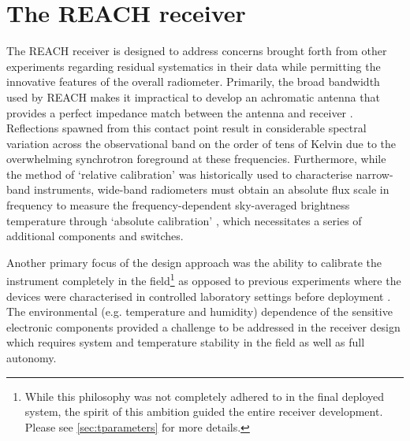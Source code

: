 \section{The REACH receiver}\label{sec:receiver_general}
The REACH receiver is designed to address concerns brought forth from other experiments regarding residual systematics in their data while permitting the innovative features of the overall radiometer. Primarily, the broad bandwidth used by REACH makes it impractical to develop an achromatic antenna that provides a perfect impedance match between the antenna and receiver \citep{reach}. Reflections spawned from this contact point result in considerable spectral variation across the observational band on the order of tens of Kelvin due to the overwhelming synchrotron foreground at these frequencies. Furthermore, while the method of ‘relative calibration’ was historically used to characterise narrow-band instruments, wide-band radiometers must obtain an absolute flux scale in frequency to measure the frequency-dependent sky-averaged brightness temperature through ‘absolute calibration’ \citep{rogersCal}, which necessitates a series of additional components and switches.

Another primary focus of the design approach was the ability to calibrate the instrument completely in the field\footnote{While this philosophy was not completely adhered to in the final deployed system, the spirit of this ambition guided the entire receiver development. Please see \cref{sec:tparameters} for more details.} as opposed to previous experiments where the devices were characterised in controlled laboratory settings before deployment \citep{edgesCal}. The environmental (e.g. temperature and humidity) dependence of the sensitive electronic components provided a challenge to be addressed in the receiver design which requires system and temperature stability in the field as well as full autonomy.

